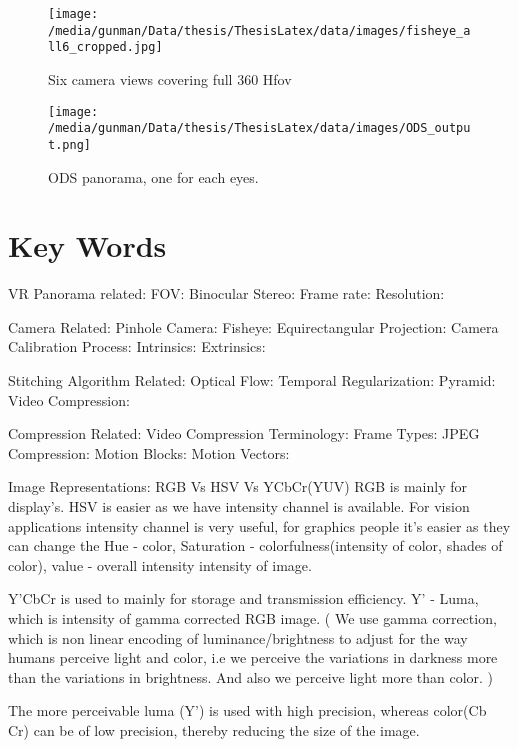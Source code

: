 \begin{figure}[h]
	\begin{center}
		\texttt{[image: /media/gunman/Data/thesis/ThesisLatex/data/images/fisheye\_all6\_cropped.jpg]}
		\caption{Six camera views covering full 360 Hfov}
		\label{ODS_input}
	\end{center}
	\vspace{-0.3in}
\end{figure} 
\begin{figure}[h]
	\begin{center}
		\texttt{[image: /media/gunman/Data/thesis/ThesisLatex/data/images/ODS\_output.png]}
		\caption{ODS panorama, one for each eyes.}
		\label{ODS_output}
	\end{center}
	\vspace{-0.3in}
\end{figure} 


\section{Key Words}
VR Panorama related:
FOV:
Binocular Stereo:
Frame rate:
Resolution:

Camera Related:
Pinhole Camera: 
Fisheye:
Equirectangular Projection:
Camera Calibration Process:
Intrinsics:
Extrinsics:

Stitching Algorithm Related:
Optical Flow:
Temporal Regularization:
Pyramid:
Video Compression: 

Compression Related:
Video Compression Terminology:
Frame Types:
JPEG Compression:
Motion Blocks:
Motion Vectors:

Image Representations:
RGB Vs HSV Vs YCbCr(YUV)
RGB is mainly for display's. HSV is easier as we have intensity channel is available. For vision applications intensity channel is very useful, for graphics people it's easier as they can change the Hue - color, Saturation - colorfulness(intensity of color, shades of color), value - overall intensity  intensity of image. 

Y'CbCr is used to mainly for storage and transmission efficiency. Y' - Luma, which is intensity of gamma corrected RGB image. 
( We use gamma correction, which is non linear encoding of luminance/brightness to adjust for the way humans perceive light and color, i.e we perceive the variations in darkness more than the variations in brightness. And also we perceive light more than color. )

The more perceivable luma (Y') is used with high precision, whereas color(Cb Cr) can be of low precision, thereby reducing the size of the image.

